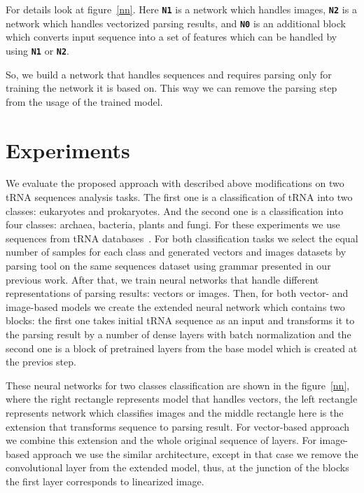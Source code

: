 \documentclass[12pt,a4paper]{cibb}
\begin{document}
For details look at figure~\ref{nn}. Here \textbf{\texttt{N1}} is a network which handles images, \textbf{\texttt{N2}} is a network which handles vectorized parsing results, and \textbf{\texttt{N0}} is an additional block which converts input sequence into a set of features which can be handled by using \textbf{\texttt{N1}} or \textbf{\texttt{N2}}.

So, we build a network that handles sequences and requires parsing only for training the network it is based on.
This way we can remove the parsing step from the usage of the trained model.


\section{\bf Experiments}

We evaluate the proposed approach with described above modifications on two tRNA sequences analysis tasks.
The first one is a classification of tRNA into two classes: eukaryotes and prokaryotes.
And the second one is a classification into four classes: archaea, bacteria, plants and fungi.
For these experiments we use sequences from tRNA databases~\cite{trnadb1,trnadb2}.
For both classification tasks we select the equal number of samples for each class and generated vectors and images datasets by parsing tool on the same sequences dataset using grammar presented in our previous work.
After that, we train neural networks that handle different representations of parsing results: vectors or images.
Then, for both vector- and image-based models we create the extended neural network which contains two blocks: the first one takes initial tRNA sequence as an input and transforms it to the parsing result by a number of dense layers with batch normalization and the second one is a block of pretrained layers from the base model which is created at the previos step.

These neural networks for two classes classification are shown in the figure~\ref{nn}, where the right rectangle represents model that handles vectors, the left rectangle represents network which classifies images and the middle rectangle here is the extension that transforms sequence to parsing result. For vector-based approach we combine this extension and the whole original sequence of layers.
For image-based approach we use the similar architecture, except in that case we remove the convolutional layer from the extended model, thus, at the junction of the blocks the first layer corresponds to linearized image.
\end{document}
